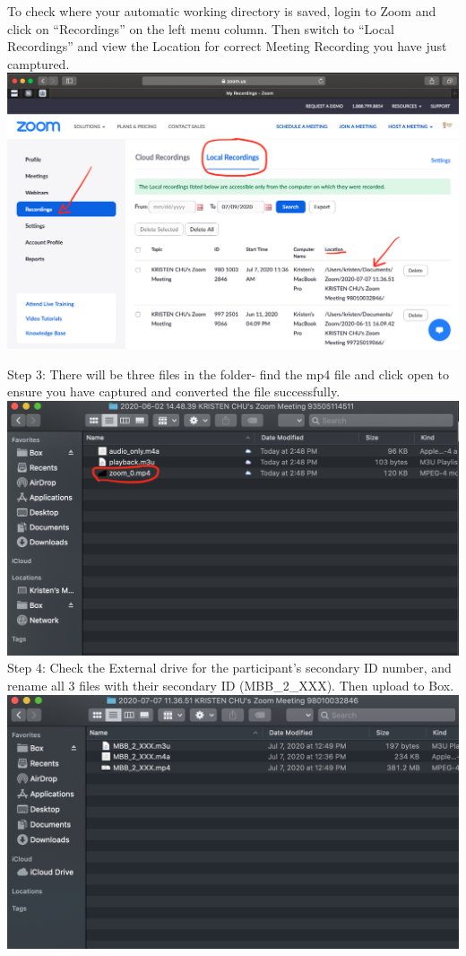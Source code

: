 \documentclass[]{book}
\begin{document}
To check where your automatic working directory is saved, login to Zoom and click on ``Recordings'' on the left menu column. Then switch to ``Local Recordings'' and view the Location for correct Meeting Recording you have just camptured. \includegraphics{images/zoom_parent_child_interaction/12.png}

Step 3:
There will be three files in the folder- find the mp4 file and click open to ensure you have captured and converted the file successfully. \includegraphics{images/zoom_parent_child_interaction/10.png}
Step 4:
Check the External drive for the participant's secondary ID number, and rename all 3 files with their secondary ID (MBB\_2\_XXX). Then upload to Box. \includegraphics{images/zoom_parent_child_interaction/11.png}
\end{document}
